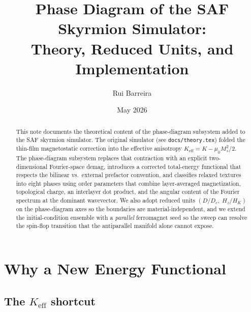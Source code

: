 \documentclass[11pt,a4paper]{article}
\title{Phase Diagram of the SAF Skyrmion Simulator:\\
Theory, Reduced Units, and Implementation}
\author{Rui Barreira}
\date{May 2026}
\newcommand{\Keff}{K_{\text{eff}}}
\newcommand{\Ms}{M_s}
\newcommand{\HK}{H_K}
\newcommand{\Dc}{D_c}
\begin{document}
\maketitle

\begin{abstract}
This note documents the theoretical content of the phase-diagram
subsystem added to the SAF skyrmion simulator. The original
simulator (see \texttt{docs/theory.tex}) folded the thin-film
magnetostatic correction into the effective anisotropy
$\Keff = K - \mu_0 \Ms^2 / 2$. The phase-diagram subsystem
replaces that contraction with an explicit two-dimensional
Fourier-space demag, introduces a corrected total-energy
functional that respects the bilinear vs.\ external prefactor
convention, and classifies relaxed textures into eight phases
using order parameters that combine layer-averaged
magnetization, topological charge, an interlayer dot product,
and the angular content of the Fourier spectrum at the
dominant wavevector. We also adopt reduced units
$(D / \Dc,\; H_z / \HK)$ on the phase-diagram axes so the
boundaries are material-independent, and we extend the
initial-condition ensemble with a \emph{parallel} ferromagnet
seed so the sweep can resolve the spin-flop transition that
the antiparallel manifold alone cannot expose.
\end{abstract}

\section{Why a New Energy Functional}

\subsection{The $\Keff$ shortcut}
\end{document}
